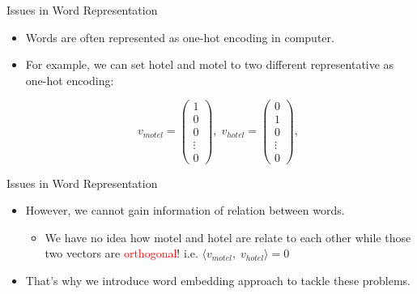 \begin{frame}[fragile]{Issues in Word Representation}

  \begin{itemize}
    \item Words are often represented as one-hot encoding in computer.
    \item For example, we can set hotel and motel to two different
          representative as one-hot encoding:
          \begin{center}
            $$
              {v_{motel}}=\begin{pmatrix} 1 \\ 0 \\ 0 \\ \vdots \\ 0 \end{pmatrix},\;
              {v_{hotel}}=\begin{pmatrix} 0 \\ 1 \\ 0 \\ \vdots \\ 0 \end{pmatrix},\;
            $$
          \end{center}
  \end{itemize}

\end{frame}

\begin{frame}[fragile]{Issues in Word Representation}

  \begin{itemize}
    \item However, we cannot gain information of relation between words.
          \begin{itemize}
            \item We have no idea how motel and hotel are relate to each other while those two vectors are \textcolor{red}{orthogonal}! i.e. $ \langle v_{motel} , \; v_{hotel} \rangle = 0$
          \end{itemize}
    \item That's why we introduce word embedding approach to tackle these problems. \cite{mikolov2013efficient}
  \end{itemize}

\end{frame}

